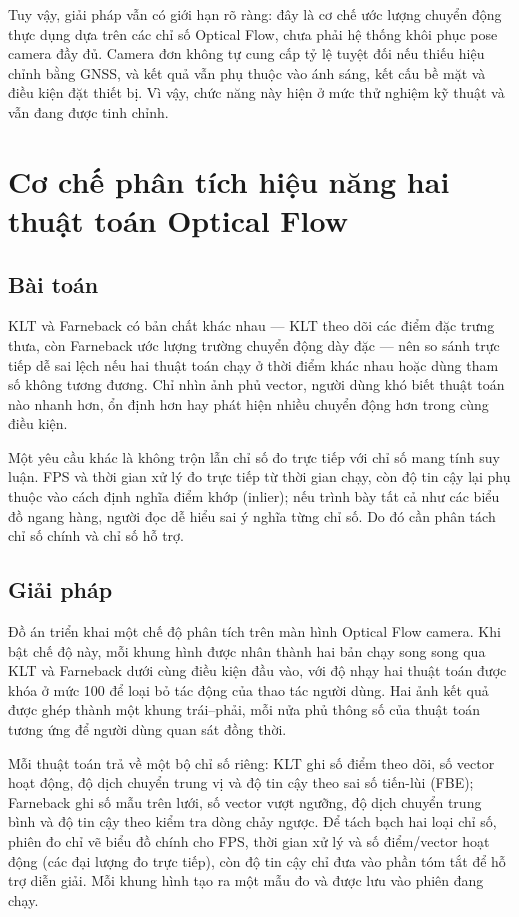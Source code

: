 \documentclass[../DoAn.tex]{subfiles}
\begin{document}
Tuy vậy, giải pháp vẫn có giới hạn rõ ràng: đây là cơ chế ước lượng chuyển động thực dụng dựa trên các chỉ số Optical Flow, chưa phải hệ thống khôi phục pose camera đầy đủ. Camera đơn không tự cung cấp tỷ lệ tuyệt đối nếu thiếu hiệu chỉnh bằng GNSS, và kết quả vẫn phụ thuộc vào ánh sáng, kết cấu bề mặt và điều kiện đặt thiết bị. Vì vậy, chức năng này hiện ở mức thử nghiệm kỹ thuật và vẫn đang được tinh chỉnh.

\section{Cơ chế phân tích hiệu năng hai thuật toán Optical Flow}
\label{section:5.2}
\subsection{Bài toán}
KLT và Farneback có bản chất khác nhau --- KLT theo dõi các điểm đặc trưng thưa, còn Farneback ước lượng trường chuyển động dày đặc --- nên so sánh trực tiếp dễ sai lệch nếu hai thuật toán chạy ở thời điểm khác nhau hoặc dùng tham số không tương đương. Chỉ nhìn ảnh phủ vector, người dùng khó biết thuật toán nào nhanh hơn, ổn định hơn hay phát hiện nhiều chuyển động hơn trong cùng điều kiện.

Một yêu cầu khác là không trộn lẫn chỉ số đo trực tiếp với chỉ số mang tính suy luận. FPS và thời gian xử lý đo trực tiếp từ thời gian chạy, còn độ tin cậy lại phụ thuộc vào cách định nghĩa điểm khớp (inlier); nếu trình bày tất cả như các biểu đồ ngang hàng, người đọc dễ hiểu sai ý nghĩa từng chỉ số. Do đó cần phân tách chỉ số chính và chỉ số hỗ trợ.

\subsection{Giải pháp}
Đồ án triển khai một chế độ phân tích trên màn hình Optical Flow camera. Khi bật chế độ này, mỗi khung hình được nhân thành hai bản chạy song song qua KLT và Farneback dưới cùng điều kiện đầu vào, với độ nhạy hai thuật toán được khóa ở mức 100 để loại bỏ tác động của thao tác người dùng. Hai ảnh kết quả được ghép thành một khung trái--phải, mỗi nửa phủ thông số của thuật toán tương ứng để người dùng quan sát đồng thời.

Mỗi thuật toán trả về một bộ chỉ số riêng: KLT ghi số điểm theo dõi, số vector hoạt động, độ dịch chuyển trung vị và độ tin cậy theo sai số tiến-lùi (FBE); Farneback ghi số mẫu trên lưới, số vector vượt ngưỡng, độ dịch chuyển trung bình và độ tin cậy theo kiểm tra dòng chảy ngược. Để tách bạch hai loại chỉ số, phiên đo chỉ vẽ biểu đồ chính cho FPS, thời gian xử lý và số điểm/vector hoạt động (các đại lượng đo trực tiếp), còn độ tin cậy chỉ đưa vào phần tóm tắt để hỗ trợ diễn giải. Mỗi khung hình tạo ra một mẫu đo và được lưu vào phiên đang chạy.
\end{document}
